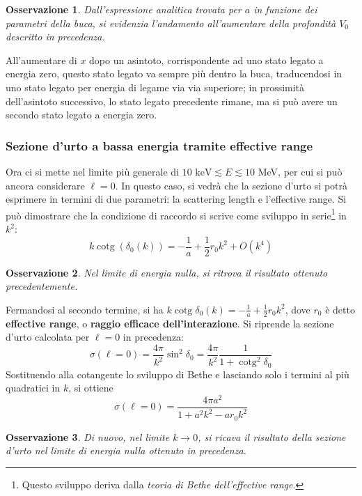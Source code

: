 \documentclass[11pt, a4paper]{scrartcl}
\theoremstyle{style}
\newtheorem{osservazione}{Osservazione}[section]
\numberwithin{equation}{subsection}
\begin{document}
\begin{osservazione}
Dall'espressione analitica trovata per $a$ in funzione dei parametri della buca, si evidenzia l'andamento all'aumentare della profondit\`a $V_0$ descritto in precedenza.
\end{osservazione}
\noindent All'aumentare di $x$ dopo un asintoto, corrispondente ad uno stato legato a energia zero, questo stato legato va sempre pi\`u dentro la buca, traducendosi in uno stato legato per energia di legame via via superiore; in prossimit\`a dell'asintoto successivo, lo stato legato precedente rimane, ma si pu\`o avere un secondo stato legato a energia zero.

\subsubsection{Sezione d'urto a bassa energia tramite effective range}

Ora ci si mette nel limite pi\`u generale di $10 \text{ keV} \lesssim E \lesssim 10$ MeV, per cui si pu\`o ancora considerare $\ell =0$.
In questo caso, si vedr\`a che la sezione d'urto si potr\`a esprimere in termini di due parametri: la scattering length e l'effective range.
Si pu\`o dimostrare che la condizione di raccordo si scrive come sviluppo in serie\footnote{Questo sviluppo deriva dalla \textit{teoria di Bethe dell'effective range}.} in $k^2$:
\begin{equation}
	k \operatorname{cotg}( \delta _0(k)) = -\frac{1}{a} + \frac{1}{2} r_0 k^2 + O(k^4)
\end{equation}
\begin{osservazione}
Nel limite di energia nulla, si ritrova il risultato ottenuto precedentemente.
\end{osservazione}

\noindent Fermandosi al secondo termine, si ha $k \operatorname{cotg} \delta _0(k) = -\frac{1}{a} + \frac{1}{2} r_0 k^2$, dove $r_0$ \`e detto \textbf{effective range}, o \textbf{raggio efficace dell'interazione}.
Si riprende la sezione d'urto calcolata per $\ell =0$ in precedenza:
\[
\sigma (\ell =0) = \frac{4\pi}{k^2} \sin^2 \delta _0 = \frac{4\pi}{k^2} \frac{1}{1+ \operatorname{cotg}^2 \delta _0 }
\] 
Sostituendo alla cotangente lo sviluppo di Bethe e lasciando solo i termini al pi\`u quadratici in $k$, si ottiene
\begin{equation}
	\sigma (\ell =0) = \frac{4\pi a^2}{1 + a ^2 k^2 - a r_0 k ^2}
\end{equation}
\begin{osservazione}
Di nuovo, nel limite $k\to 0$, si ricava il risultato della sezione d'urto nel limite di energia nulla ottenuto in precedenza.
\end{osservazione}
\end{document}
